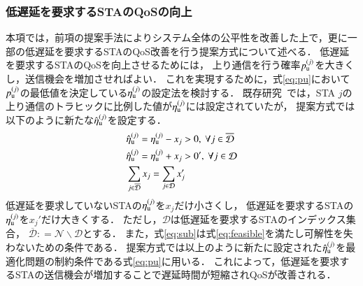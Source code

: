 \documentclass[master]{kuisthesis}		%
\newcommand{\etau}{\eta_{\rm u}^{(j)}}
\def\equiv{\mathrel{\mathop:}=}
\begin{document}
		\subsubsection{低遅延を要求するSTAのQoSの向上}\label{sec:qos}
			本項では，前項の提案手法によりシステム全体の公平性を改善した上で，更に一部の低遅延を要求するSTAのQoS改善を行う提案方式について述べる．
			低遅延を要求するSTAのQoSを向上させるためには，
			上り通信を行う確率$p_{\rm u}^{(j)}$を大きくし，送信機会を増加させればよい．
			これを実現するために，式\eqref{eq:pu}において$p_{\rm u}^{(j)}$の最低値を決定している$\etau$の設定法を検討する．
			既存研究~\cite{promac}では，STA $j$の上り通信のトラヒックに比例した値が$\etau$には設定されていたが，
			提案方式では以下のように新たな${\hat \eta}_{\rm u}^{(j)}$を設定する．
			\begin{align}
				&{\hat \eta}_{\rm u}^{(j)} = \etau -x_j>0,\ \forall j \in {\overline {\mathcal D}} \label{eq:new_etau_dbar}\\
				&{\hat \eta}_{\rm u}^{(j)} = \etau + x_j>0',\ \forall j \in {\mathcal D} \label{eq:new_etau_d}\\
				&\sum_{j\in{\overline {\mathcal D}}} x_j = \sum_{j\in{\mathcal D}} x_j' \label{eq:sub}
			\end{align}
			低遅延を要求していないSTAの$\etau$を$x_j$だけ小さくし，
			低遅延を要求するSTAの$\etau$を$x_j'$だけ大きくする．
			ただし，$\mathcal D$は低遅延を要求するSTAのインデックス集合，
			${\overline {\mathcal D}}\equiv{\mathcal N}\backslash{\mathcal D}$とする．
			また，式\eqref{eq:sub}は式\eqref{eq:feasible}を満たし可解性を失わないための条件である．
			提案方式では以上のように新たに設定された${\hat \eta}_{\rm u}^{(j)}$を最適化問題の制約条件である式\eqref{eq:pu}に用いる．
			これによって，低遅延を要求するSTAの送信機会が増加することで遅延時間が短縮されQoSが改善される．
\end{document}
